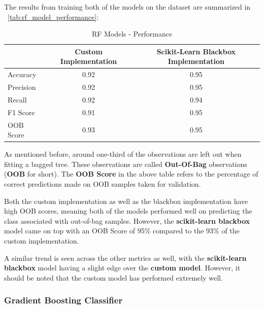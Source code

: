 The results from training both of the models on the dataset are summarized in ~\autoref{tab:rf_model_performance}:

\begin{table}[H]
  \centering
  \begin{tabular}{lcc}
    \toprule
              & \textbf{Custom Implementation} & \textbf{Scikit-Learn Blackbox Implementation} \\
    \midrule
    Accuracy  & {0.92}                         & 0.95                                          \\
    Precision & {0.92}                         & 0.95                                          \\
    Recall    & 0.92                           & {0.94}                                        \\
    F1 Score  & 0.91                           & {0.95}                                        \\
    OOB Score & 0.93                           & {0.95}                                        \\
    \bottomrule
  \end{tabular}
  \caption{RF Models - Performance}
  \label{tab:rf_model_performance}
\end{table}

As mentioned before, around one-third of the observations are left out when fitting a bagged tree. These observations are called \textbf{Out-Of-Bag} observations (\textbf{OOB} for short). The \textbf{OOB Score} in the above table refers to the percentage of correct predictions made on OOB samples taken for validation.

Both the custom implementation as well as the blackbox implementation have high OOB scores, meaning both of the models performed well on predicting the class associated with out-of-bag samples. However, the \textbf{scikit-learn blackbox} model came on top with an OOB Score of 95\% compared to the 93\% of the custom implementation.

A similar trend is seen across the other metrics as well, with the \textbf{scikit-learn blackbox} model having a slight edge over the \textbf{custom model}. However, it should be noted that the custom model has performed extremely well.

\subsubsection{Gradient Boosting Classifier}

